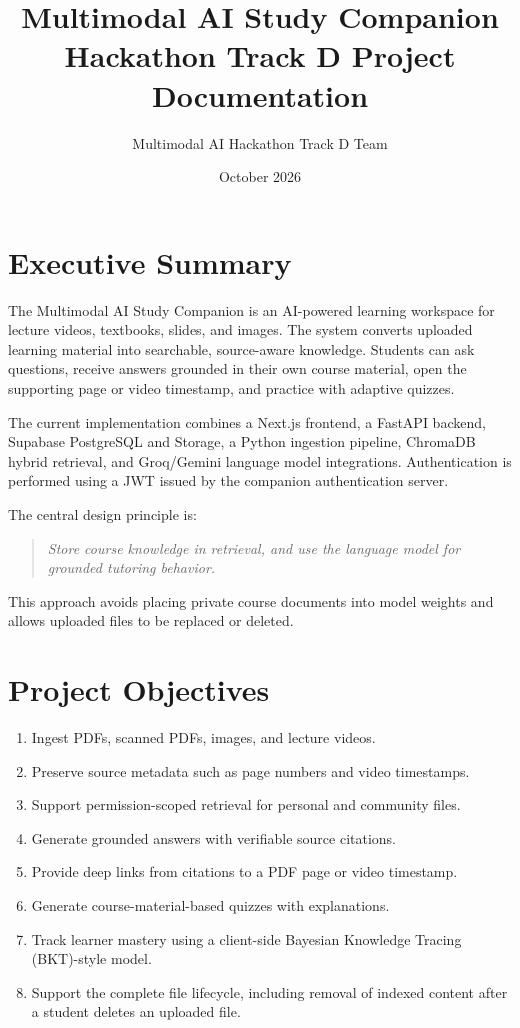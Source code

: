 \documentclass[11pt,a4paper]{article}
\title{\textbf{Multimodal AI Study Companion}\\
\large Hackathon Track D Project Documentation}
\author{Multimodal AI Hackathon Track D Team}
\date{October 2026}
\begin{document}
\maketitle
\tableofcontents
\newpage

\section{Executive Summary}

The Multimodal AI Study Companion is an AI-powered learning workspace for
lecture videos, textbooks, slides, and images. The system converts uploaded
learning material into searchable, source-aware knowledge. Students can ask
questions, receive answers grounded in their own course material, open the
supporting page or video timestamp, and practice with adaptive quizzes.

The current implementation combines a Next.js frontend, a FastAPI backend,
Supabase PostgreSQL and Storage, a Python ingestion pipeline, ChromaDB hybrid
retrieval, and Groq/Gemini language model integrations. Authentication is
performed using a JWT issued by the companion authentication server.

The central design principle is:

\begin{quote}
\emph{Store course knowledge in retrieval, and use the language model for
grounded tutoring behavior.}
\end{quote}

This approach avoids placing private course documents into model weights and
allows uploaded files to be replaced or deleted.

\section{Project Objectives}

\begin{enumerate}[leftmargin=*]
  \item Ingest PDFs, scanned PDFs, images, and lecture videos.
  \item Preserve source metadata such as page numbers and video timestamps.
  \item Support permission-scoped retrieval for personal and community files.
  \item Generate grounded answers with verifiable source citations.
  \item Provide deep links from citations to a PDF page or video timestamp.
  \item Generate course-material-based quizzes with explanations.
  \item Track learner mastery using a client-side Bayesian Knowledge Tracing
        (BKT)-style model.
  \item Support the complete file lifecycle, including removal of indexed
        content after a student deletes an uploaded file.
\end{enumerate}
\end{document}
